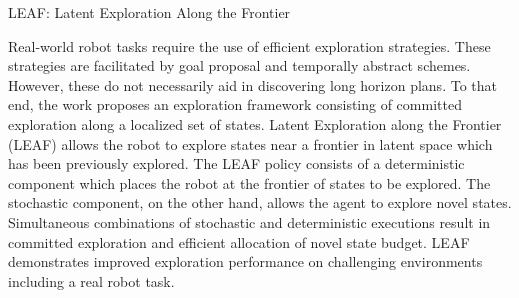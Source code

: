 \documentclass[11pt,letterpaper]{article}
\begin{document}
\begin{center}
  \large{LEAF: Latent Exploration Along the Frontier}
\end{center}
Real-world robot tasks require the use of efficient exploration strategies. These strategies are facilitated by goal proposal and temporally abstract schemes. However, these do not necessarily aid in discovering long horizon plans. To that end, the work proposes an exploration framework consisting of committed exploration along a localized set of states. Latent Exploration along the Frontier (LEAF) allows the robot to explore states near a frontier in latent space which has been previously explored. The LEAF policy consists of a deterministic component which places the robot at the frontier of states to be explored. The stochastic component, on the other hand, allows the agent to explore novel states. Simultaneous combinations of stochastic and deterministic executions result in committed exploration and efficient allocation of novel state budget. LEAF demonstrates improved exploration performance on challenging environments including a real robot task. 
\end{document}
